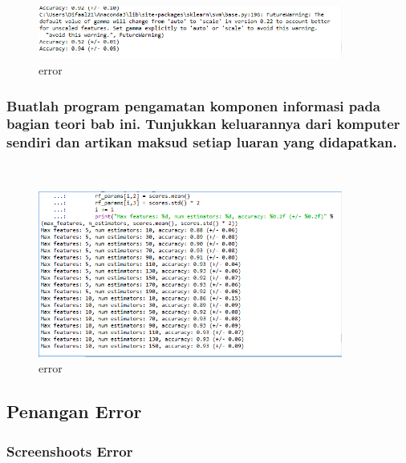 	
		
	\begin{figure}[H]
		\begin{center}
		 \includegraphics[width=10cm]{figures/1174076/figures4/12.png}
		 \caption{error}	
		\end{center}
	\end{figure}

	\subsubsection{Buatlah program pengamatan komponen informasi pada bagian teori bab ini. Tunjukkan keluarannya dari komputer sendiri dan artikan maksud setiap luaran yang didapatkan.}\hfill\\
	
	
		
	\begin{figure}[H]
		\begin{center}
		 \includegraphics[width=10cm]{figures/1174076/figures4/13.png}
		 \caption{error}	
		\end{center}
	\end{figure}
	
\subsection{Penangan Error}
	
	\subsubsection{Screenshoots Error}\hfill\\
	
